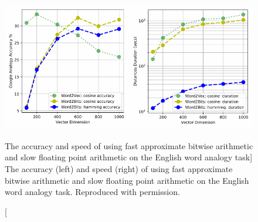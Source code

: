 \begin{figure}
\includegraphics{word2bits-speed}
\vspace{-0.8cm}
\caption
  [The accuracy and speed of using fast approximate bitwise arithmetic
   and slow floating point arithmetic on the English word analogy task]%
  {The accuracy (left) and speed (right) of using fast approximate
   bitwise arithmetic and slow floating point arithmetic on the English word
   analogy task. Reproduced with permission. \cite[Figure 3.8]{stefanik2019semantic}}
\label{fig:quantized-token-embeddings-with-fast-bitwise-arithmetic}
\end{figure}

